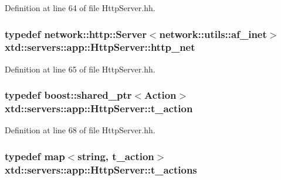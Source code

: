 Definition at line 64 of file Http\-Server.\-hh.

\hypertarget{classxtd_1_1servers_1_1app_1_1HttpServer_ac5263de622bb17c3ec921a00266ea053}{
\subsubsection[{http\-\_\-net}]{\setlength{\rightskip}{0pt plus 5cm}typedef network\-::http\-::\-Server$<$network\-::utils\-::af\-\_\-inet$>$ {\bf xtd\-::servers\-::app\-::\-Http\-Server\-::http\-\_\-net}\hspace{0.3cm}{\ttfamily [protected]}}}\label{classxtd_1_1servers_1_1app_1_1HttpServer_ac5263de622bb17c3ec921a00266ea053}


Definition at line 65 of file Http\-Server.\-hh.

\hypertarget{classxtd_1_1servers_1_1app_1_1HttpServer_a1353c6e9098dd5f8a74d978a7049ad27}{
\subsubsection[{t\-\_\-action}]{\setlength{\rightskip}{0pt plus 5cm}typedef boost\-::shared\-\_\-ptr$<${\bf Action}$>$ {\bf xtd\-::servers\-::app\-::\-Http\-Server\-::t\-\_\-action}\hspace{0.3cm}{\ttfamily [protected]}}}\label{classxtd_1_1servers_1_1app_1_1HttpServer_a1353c6e9098dd5f8a74d978a7049ad27}


Definition at line 68 of file Http\-Server.\-hh.

\hypertarget{classxtd_1_1servers_1_1app_1_1HttpServer_ac61c9a29bf64b94cb8ca4c766f8309c3}{
\subsubsection[{t\-\_\-actions}]{\setlength{\rightskip}{0pt plus 5cm}typedef map$<$string, {\bf t\-\_\-action}$>$ {\bf xtd\-::servers\-::app\-::\-Http\-Server\-::t\-\_\-actions}\hspace{0.3cm}{\ttfamily [protected]}}}\label{classxtd_1_1servers_1_1app_1_1HttpServer_ac61c9a29bf64b94cb8ca4c766f8309c3}


